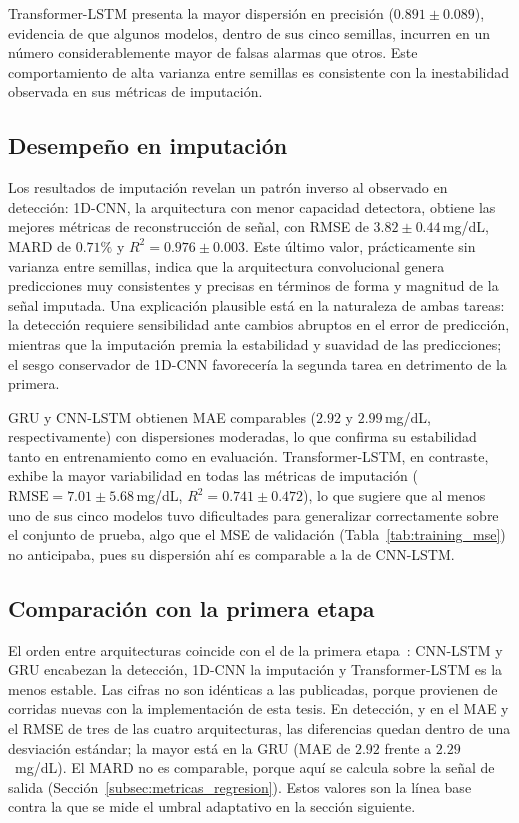 \documentclass{report}
\begin{document}
Transformer-LSTM presenta la mayor dispersión en precisión ($0.891 \pm 0.089$), evidencia de que algunos modelos, dentro de sus cinco semillas, incurren en un número considerablemente mayor de falsas alarmas que otros. Este comportamiento de alta varianza entre semillas es consistente con la inestabilidad observada en sus métricas de imputación.

\subsection*{Desempeño en imputación}

Los resultados de imputación revelan un patrón inverso al observado en detección: 1D-CNN, la arquitectura con menor capacidad detectora, obtiene las mejores métricas de reconstrucción de señal, con RMSE de $3.82 \pm 0.44$\,mg/dL, MARD de $0.71\%$ y $R^2 = 0.976 \pm 0.003$. Este último valor, prácticamente sin varianza entre semillas, indica que la arquitectura convolucional genera predicciones muy consistentes y precisas en términos de forma y magnitud de la señal imputada. Una explicación plausible está en la naturaleza de ambas tareas: la detección requiere sensibilidad ante cambios abruptos en el error de predicción, mientras que la imputación premia la estabilidad y suavidad de las predicciones; el sesgo conservador de 1D-CNN favorecería la segunda tarea en detrimento de la primera.

GRU y CNN-LSTM obtienen MAE comparables ($2.92$ y $2.99$\,mg/dL, respectivamente) con dispersiones moderadas, lo que confirma su estabilidad tanto en entrenamiento como en evaluación. Transformer-LSTM, en contraste, exhibe la mayor variabilidad en todas las métricas de imputación ($\text{RMSE} = 7.01 \pm 5.68$\,mg/dL, $R^2 = 0.741 \pm 0.472$), lo que sugiere que al menos uno de sus cinco modelos tuvo dificultades para generalizar correctamente sobre el conjunto de prueba, algo que el MSE de validación (Tabla~\ref{tab:training_mse}) no anticipaba, pues su dispersión ahí es comparable a la de CNN-LSTM.

\subsection*{Comparación con la primera etapa}

El orden entre arquitecturas coincide con el de la primera etapa~\cite{sanchez2025imputation}: CNN-LSTM y GRU encabezan la detección, 1D-CNN la imputación y Transformer-LSTM es la menos estable. Las cifras no son idénticas a las publicadas, porque provienen de corridas nuevas con la implementación de esta tesis. En detección, y en el MAE y el RMSE de tres de las cuatro arquitecturas, las diferencias quedan dentro de una desviación estándar; la mayor está en la GRU (MAE de $2.92$ frente a $2.29$~mg/dL). El MARD no es comparable, porque aquí se calcula sobre la señal de salida (Sección~\ref{subsec:metricas_regresion}). Estos valores son la línea base contra la que se mide el umbral adaptativo en la sección siguiente.
\end{document}
